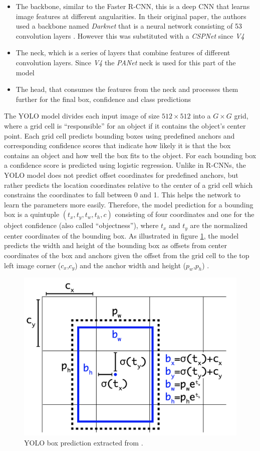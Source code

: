 \begin{itemize}
	\item The backbone, similar to the Faster \ac{R-CNN}, this is a deep \ac{CNN} that learns image features at different angularities. In their original paper, the authors used a backbone named \textit{Darknet} that is a neural network consisting of 53 convolution
	layers \autocite{yolov3}. However this was substituted with a \textit{CSPNet} \autocite{wang2020cspnet} since \textit{V4} \autocite{yolov4}
	\item The neck, which is a series of layers that combine features of different convolution layers. Since \textit{V4} the \textit{PANet} \autocite{tan2020efficientdet} neck is used for this part of the model 
	\item The head, that consumes the features from the neck and processes them further for the final box, confidence and class predictions
\end{itemize}

The \ac{YOLO} model divides each input image of size $512\times512$ into a $G\times G$ grid, where a grid cell is \enquote{responsible} for an object if it contains the object's center point. Each grid cell predicts bounding boxes using predefined anchors and corresponding confidence scores that indicate how likely it is that the box contains an object and how well the box fits to the object. For each bounding box a confidence score is predicted using logistic regression. Unlike in \acp{R-CNN}, the \ac{YOLO} model does not predict offset coordinates for predefined anchors, but rather predicts the location coordinates relative to the center of a grid cell which constrains the coordinates to fall between 0 and 1. This helps the network to learn the parameters more easily. Therefore, the model prediction for a bounding box is a quintuple $(t_x,t_y,t_w,t_h,c)$ consisting of four coordinates and one for the object confidence (also called \enquote{objectness}), where $t_x$ and $t_y$ are the normalized center coordinates of the bounding box. As illustrated in figure \ref{fig:yolo_box}, the model predicts the width and height of the bounding box as offsets from center coordinates of the box and anchors given the offset from the grid cell to the top left image corner ($c_x$,$c_y$) and the anchor width and height ($p_w$,$p_h$) \autocite{yolov2} \autocite{yolov3}.

\begin{figure}[h!]
	\centering
	\includegraphics[width=.45\linewidth]{img/boxpred.png}
	\caption{\ac{YOLO} box prediction extracted from \autocite{yolov3}.}
	\label{fig:yolo_box}
\end{figure}


